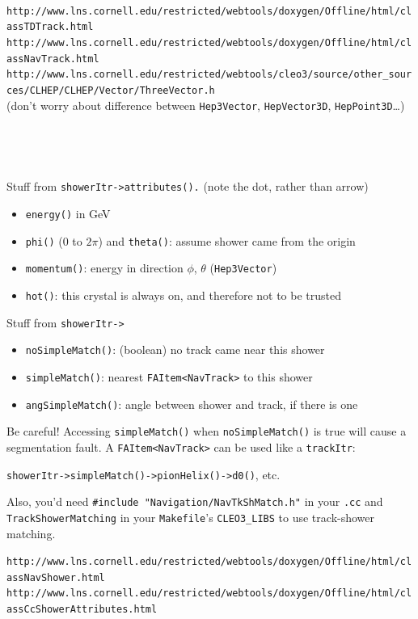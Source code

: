 \documentclass[landscape]{article}
\newenvironment{slide}{\mbox{ }\vfill}{\vfill \mbox{ } \pagebreak}
\begin{document}
\begin{slide}
\vfill
\begin{minipage}{\linewidth}
\large {\tt http://www.lns.cornell.edu/restricted/webtools/doxygen/Offline/html/classTDTrack.html \\
http://www.lns.cornell.edu/restricted/webtools/doxygen/Offline/html/classNavTrack.html \\
http://www.lns.cornell.edu/restricted/webtools/cleo3/source/other\_sources/CLHEP/CLHEP/Vector/ThreeVector.h} \\
(don't worry about difference between {\tt Hep3Vector}, {\tt HepVector3D}, {\tt HepPoint3D}\ldots)
\end{minipage}
\end{slide}

\begin{slide}
\huge

Stuff from {\tt showerItr->attributes().} (note the dot, rather than arrow)
\begin{itemize}
  \item {\tt energy()} in GeV
  \item {\tt phi()} (0 to $2\pi$) and {\tt theta()}: assume shower came from the origin
  \item {\tt momentum()}: energy in direction $\phi$, $\theta$ ({\tt Hep3Vector})
  \item {\tt hot()}: this crystal is always on, and therefore not to
    be trusted
\end{itemize}

\vfill
Stuff from {\tt showerItr->}
\begin{itemize}
  \item {\tt noSimpleMatch()}: (boolean) no track came near this shower
  \item {\tt simpleMatch()}: nearest {\tt FAItem<NavTrack>} to this shower
  \item {\tt angSimpleMatch()}: angle between shower and track, if
    there is one
\end{itemize}

\vfill
Be careful!  Accessing {\tt simpleMatch()} when {\tt noSimpleMatch()}
is true will cause a segmentation fault.  A {\tt FAItem<NavTrack>} can
be used like a {\tt trackItr}:
\begin{center}
  {\tt showerItr->simpleMatch()->pionHelix()->d0()}, etc.
\end{center}
Also, you'd need {\tt \#include "Navigation/NavTkShMatch.h"} in your
{\tt .cc} and \\ {\tt TrackShowerMatching} in your {\tt Makefile}'s
{\tt CLEO3\_LIBS} to use track-shower matching.

\vfill
\begin{minipage}{\linewidth}
\large {\tt http://www.lns.cornell.edu/restricted/webtools/doxygen/Offline/html/classNavShower.html \\
http://www.lns.cornell.edu/restricted/webtools/doxygen/Offline/html/classCcShowerAttributes.html}
\end{minipage}
\end{slide}
\end{document}
